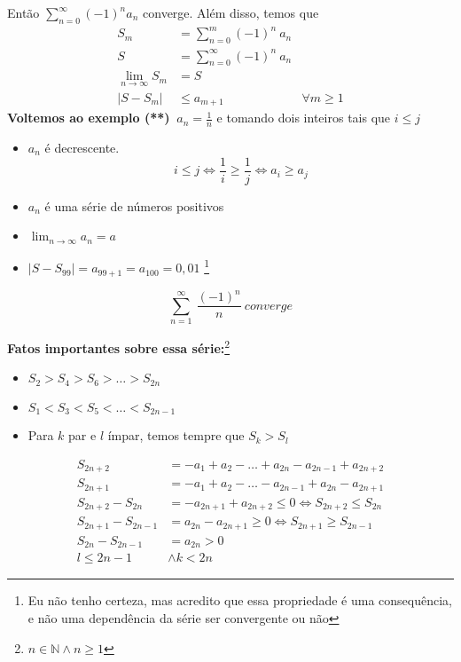 \documentclass[12pt,openany, letterpaper]{book}
\begin{document}
Então $\displaystyle{\sum_{n=0}^{\infty} (-1)^n a_n}$ converge. Além disso, temos que \begin{align}
S_m &= \sum_{n=0}^m (-1)^n \ a_n \\
S &= \sum_{n=0}^{\infty} (-1)^n \ a_n \\
\lim_{n \rightarrow \infty} S_m &= S \\
|S-S_m| &\leq a_{m+1} & \forall m \geq 1
\end{align}
\textbf{Voltemos ao exemplo (**)} $ \ \displaystyle{a_n = \frac{1}{n}}$ e tomando dois inteiros tais que $i \leq j$ \begin{itemize}
\item $a_n$ é decrescente. $$ i \leq j \Longleftrightarrow \frac{1}{i} \geq \frac{1}{j} \Longleftrightarrow a_i \geq a_j $$ 
\item $a_n$ é uma série de números positivos
\item $\displaystyle{\lim_{n \rightarrow \infty} a_n = a}$
\item $\displaystyle{|S-S_{99}| = a_{99+1} = a_{100} = 0,01}$ \footnote{Eu não tenho certeza, mas acredito que essa propriedade é uma consequência, e não uma dependência da série ser convergente ou não}
\end{itemize}
$$\sum_{n=1}^\infty \ \frac{(-1)^n}{n} \ converge$$ 

\textbf{Fatos importantes sobre essa série:}\footnote{$n \in \mathds{N} \land n \geq 1$}
\begin{itemize}
\item $S_2 > S_4 > S_6 > \hdots > S_{2n}$
\item $S_1 < S_3 < S_5 < \hdots < S_{2n-1}$
\item Para $k$ par e $l$ ímpar, temos tempre que $S_k > S_l$
\end{itemize}

\begin{align}
S_{2n+2} &= -a_1 + a_2 - \hdots + a_{2n} - a_{2n-1} + a_{2n+2}\\
S_{2n+1} &= -a_1 + a_2 - \hdots - a_{2n-1} + a_{2n} - a_{2n+1}\\
S_{2n+2} - S_{2n} &= -a_{2n+1} + a_{2n+2} \leq 0 \Longleftrightarrow S_{2n+2} \leq S_{2n} \label{212A}\\
S_{2n+1} - S_{2n-1} &= a_{2n} - a_{2n+1} \geq 0 \Longleftrightarrow S_{2n+1} \geq S_{2n-1} \label{212B}\\
S_{2n} - S_{2n-1} &= a_{2n} > 0 \label{212C} \\
l \leq 2n-1 &\land k < 2n
\end{align}
\end{document}
